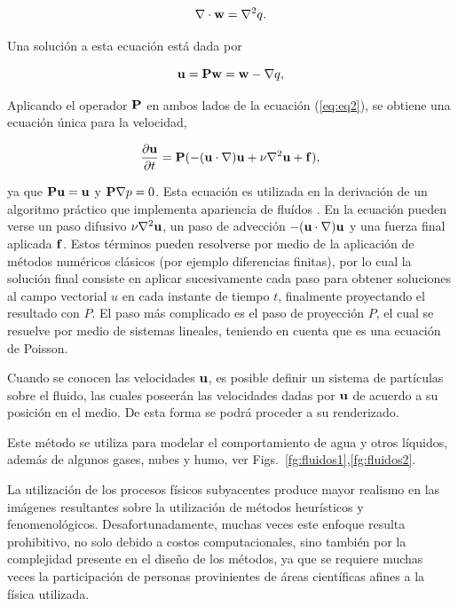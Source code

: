 \begin{equation}
\label{eq:eq4}
\nabla\cdot\bold{w} = \nabla^{2} q.
\end{equation}

Una solución a esta ecuación está dada por

\begin{equation}
\label{eq:eq5}
\bold{u} = \bold{P}\bold{w} = \bold{w} - \nabla q,
\end{equation}

Aplicando el operador $\bold{P}$ en ambos lados de la ecuación (\ref{eq:eq2}), se obtiene una ecuación única para la velocidad,

\begin{equation}
\frac{\partial \bold{u} }{\partial t} = \bold{P} (- (\bold{u} \cdot \nabla) \bold{u} + \nu \nabla^{2} \bold{u} + \bold{f}) \label{eq:eq6},
\end{equation}

ya que $\bold{P}\bold{u} = \bold{u}$ y $\bold{P}\nabla p = 0$.
Esta ecuación es utilizada en la derivación de un algoritmo práctico que implementa apariencia de fluídos \cite{Stam1999}.
En la ecuación pueden verse un paso difusivo $\nu \nabla^{2} \bold{u}$, un paso de advección $- (\bold{u} \cdot \nabla) \bold{u}$ y una fuerza final aplicada $\bold{f}$.
Estos términos pueden resolverse por medio de la aplicación de métodos numéricos clásicos (por ejemplo diferencias finitas), por lo cual la solución final consiste en aplicar sucesivamente cada paso para obtener soluciones al campo vectorial $u$ en cada instante de tiempo $t$, finalmente proyectando el resultado con $P$.
El paso más complicado es el paso de proyección $P$, el cual se resuelve por medio de sistemas lineales, teniendo en cuenta que es una ecuación de Poisson.

Cuando se conocen las velocidades $\bold{u}$, es posible definir un sistema de partículas sobre el fluido, las cuales poseerán las velocidades dadas por $\bold{u}$ de acuerdo a su posición en el medio.
De esta forma se podrá proceder a su renderizado.

Este método se utiliza para modelar el comportamiento de agua y otros líquidos, además de algunos gases, nubes y humo, ver Figs.~\ref{fg:fluidos1},\ref{fg:fluidos2}.

La utilización de los procesos físicos subyacentes produce mayor realismo en las imágenes resultantes sobre la utilización de métodos heurísticos y fenomenológicos.
Desafortunadamente, muchas veces este enfoque resulta prohibitivo, no solo debido a costos computacionales, sino también por la complejidad presente en el diseño de los métodos, ya que se requiere muchas veces la participación de personas provinientes de áreas científicas afines a la física utilizada.


